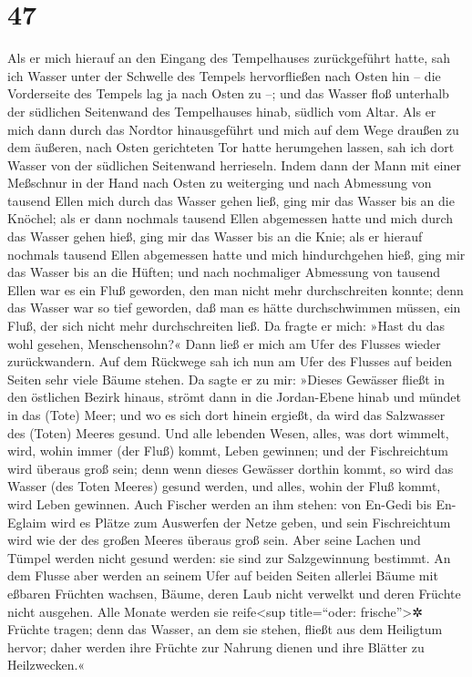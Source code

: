 \hypertarget{section-46}{%
\section{47}\label{section-46}}

Als er mich hierauf an den Eingang des Tempelhauses
zurückgeführt hatte, sah ich Wasser unter der Schwelle des Tempels
hervorfließen nach Osten hin -- die Vorderseite des Tempels lag ja nach
Osten zu --; und das Wasser floß unterhalb der südlichen Seitenwand des
Tempelhauses hinab, südlich vom Altar. Als er mich dann
durch das Nordtor hinausgeführt und mich auf dem Wege draußen zu dem
äußeren, nach Osten gerichteten Tor hatte herumgehen lassen, sah ich
dort Wasser von der südlichen Seitenwand herrieseln. Indem
dann der Mann mit einer Meßschnur in der Hand nach Osten zu weiterging
und nach Abmessung von tausend Ellen mich durch das Wasser gehen ließ,
ging mir das Wasser bis an die Knöchel; als er dann
nochmals tausend Ellen abgemessen hatte und mich durch das Wasser gehen
hieß, ging mir das Wasser bis an die Knie; als er hierauf nochmals
tausend Ellen abgemessen hatte und mich hindurchgehen hieß, ging mir das
Wasser bis an die Hüften; und nach nochmaliger Abmessung
von tausend Ellen war es ein Fluß geworden, den man nicht mehr
durchschreiten konnte; denn das Wasser war so tief geworden, daß man es
hätte durchschwimmen müssen, ein Fluß, der sich nicht mehr
durchschreiten ließ. Da fragte er mich: »Hast du das wohl
gesehen, Menschensohn?« Dann ließ er mich am Ufer des Flusses wieder
zurückwandern. Auf dem Rückwege sah ich nun am Ufer des
Flusses auf beiden Seiten sehr viele Bäume stehen. Da
sagte er zu mir: »Dieses Gewässer fließt in den östlichen Bezirk hinaus,
strömt dann in die Jordan-Ebene hinab und mündet in das (Tote) Meer; und
wo es sich dort hinein ergießt, da wird das Salzwasser des (Toten)
Meeres gesund. Und alle lebenden Wesen, alles, was dort
wimmelt, wird, wohin immer (der Fluß) kommt, Leben gewinnen; und der
Fischreichtum wird überaus groß sein; denn wenn dieses Gewässer dorthin
kommt, so wird das Wasser (des Toten Meeres) gesund werden, und alles,
wohin der Fluß kommt, wird Leben gewinnen. Auch Fischer
werden an ihm stehen: von En-Gedi bis En-Eglaim wird es Plätze zum
Auswerfen der Netze geben, und sein Fischreichtum wird wie der des
großen Meeres überaus groß sein. Aber seine Lachen und
Tümpel werden nicht gesund werden: sie sind zur Salzgewinnung bestimmt.
An dem Flusse aber werden an seinem Ufer auf beiden
Seiten allerlei Bäume mit eßbaren Früchten wachsen, Bäume, deren Laub
nicht verwelkt und deren Früchte nicht ausgehen. Alle Monate werden sie
reife\textless sup title=``oder: frische''\textgreater✲ Früchte tragen;
denn das Wasser, an dem sie stehen, fließt aus dem Heiligtum hervor;
daher werden ihre Früchte zur Nahrung dienen und ihre Blätter zu
Heilzwecken.«


